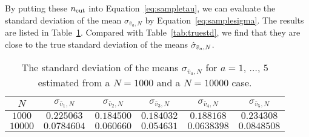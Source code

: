 By putting these \(n_\textnormal{cut}\) into Equation~\eqref{eq:sampletau},
we can evaluate the standard deviation of the mean \(\sigma_{\bar{v}_a,N}\)
by Equation~\eqref{eq:samplesigma}. The results are listed in Table~\ref{tab:samplesigma}.
Compared with Table~\ref{tab:truestd}, we find that they are close to the true
standard deviation of the means \(\hat{\sigma}_{\bar{v}_a,N}\).

\begin{table}[H]
    \centering
    \caption{The standard deviation of the means
        \(\sigma_{\bar{v}_a,N}\) for \(a = 1\), \(\ldots\), \(5\) estimated from a \(N = 1000\)
        and a \(N = 10000\) case.}
    \label{tab:samplesigma}
    \begin{tabular}{@{}cccccc@{}}
        \toprule
        \(N\)     & \(\sigma_{\bar{v}_1,N}\) & \(\sigma_{\bar{v}_2,N}\) & \(\sigma_{\bar{v}_3,N}\) & \(\sigma_{\bar{v}_4,N}\) & \(\sigma_{\bar{v}_5,N}\) \\
        \midrule
        \(1000\)  & \(0.225063\)             & \(0.184500\)             & \(0.184032\)             & \(0.188168\)             & \(0.234308\)             \\
        \(10000\) & \(0.0784604\)            & \(0.060660\)             & \(0.054631\)             & \(0.0638398\)            & \(0.0848508\)            \\
        \bottomrule
    \end{tabular}
\end{table}

